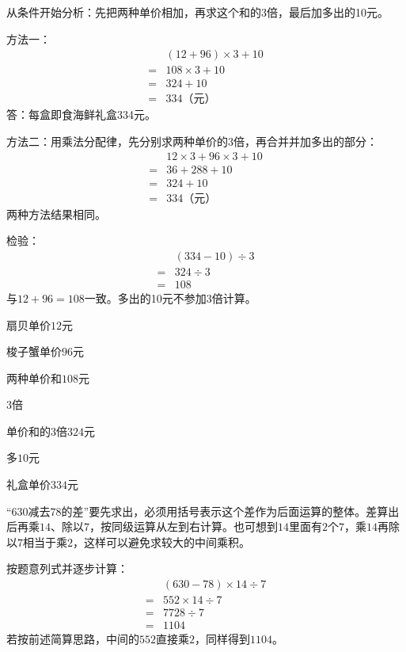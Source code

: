 \documentclass[multi=snippet,border=0pt]{standalone}
\newenvironment{snippet}[3]{\begin{minipage}{#1bp}\color{answerred}\fontsize{#2}{#3}\selectfont\raggedright}{\end{minipage}}
\begin{document}
\begin{snippet}{505}{11.5}{14}从条件开始分析：先把两种单价相加，再求这个和的3倍，最后加多出的10元。\par 方法一：\[\begin{aligned}&(12+96)\times3+10\\={}&108\times3+10\\={}&324+10\\={}&334\text{（元）}\end{aligned}\]答：每盒即食海鲜礼盒334元。\par 方法二：用乘法分配律，先分别求两种单价的3倍，再合并并加多出的部分：\[\begin{aligned}&12\times3+96\times3+10\\={}&36+288+10\\={}&324+10\\={}&334\text{（元）}\end{aligned}\]两种方法结果相同。\par 检验：\[\begin{aligned}&(334-10)\div3\\={}&324\div3\\={}&108\end{aligned}\]与\(12+96=108\)一致。多出的10元不参加3倍计算。\end{snippet}
\begin{snippet}{55.549999999999955}{7.5}{12.8}扇贝单价\(12\)元\end{snippet}
\begin{snippet}{55.549999999999955}{7.5}{12.8}梭子蟹单价\(96\)元\end{snippet}
\begin{snippet}{93.29999999999995}{8.5}{12.8}两种单价和\(108\)元\end{snippet}
\begin{snippet}{40.799999999999955}{8.5}{12.8}\(3\)倍\end{snippet}
\begin{snippet}{117.29999999999995}{8.5}{12.8}单价和的\(3\)倍\(324\)元\end{snippet}
\begin{snippet}{40.299999999999955}{8.5}{12.8}多\(10\)元\end{snippet}
\begin{snippet}{111.79999999999995}{8.5}{12.8}礼盒单价\(334\)元\end{snippet}
\begin{snippet}{505}{11.5}{14}“\(630\)减去\(78\)的差”要先求出，必须用括号表示这个差作为后面运算的整体。差算出后再乘\(14\)、除以\(7\)，按同级运算从左到右计算。也可想到\(14\)里面有\(2\)个\(7\)，乘\(14\)再除以\(7\)相当于乘\(2\)，这样可以避免求较大的中间乘积。\par 按题意列式并逐步计算：\[\begin{aligned}&(630-78)\times14\div7\\={}&552\times14\div7\\={}&7728\div7\\={}&1104\end{aligned}\]若按前述简算思路，中间的\(552\)直接乘\(2\)，同样得到\(1104\)。\end{snippet}
\end{document}
